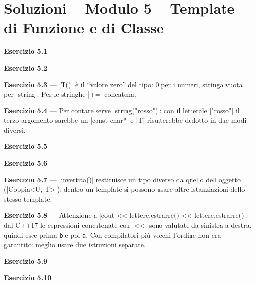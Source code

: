 \chapter{Soluzioni -- Modulo 5 -- Template di Funzione e di Classe}
\textbf{Esercizio 5.1}

\textbf{Esercizio 5.2}

\textbf{Esercizio 5.3} --- \cc|T()| è il ``valore zero'' del tipo: 0 per i numeri,
stringa vuota per \cc|string|. Per le stringhe \cc|+=| concatena.

\textbf{Esercizio 5.4} --- Per contare  serve \cc|string("rosso")|:
con il letterale \cc|"rosso"| il terzo argomento sarebbe un \cc|const char*| e
\cc|T| risulterebbe dedotto in due modi diversi.

\textbf{Esercizio 5.5}

\textbf{Esercizio 5.6}

\textbf{Esercizio 5.7} --- \cc|invertita()| restituisce un tipo diverso da quello
dell'oggetto (\cc|Coppia<U, T>|): dentro un template si possono usare altre
istanziazioni dello stesso template.

\textbf{Esercizio 5.8} --- Attenzione a
\cc|cout << lettere.estrarre() << lettere.estrarre()|: dal C++17 le espressioni
concatenate con \cc|<<| sono valutate da sinistra a destra, quindi esce prima
\texttt{b} e poi \texttt{a}. Con compilatori più vecchi l'ordine non era garantito:
meglio usare due istruzioni separate.

\textbf{Esercizio 5.9}

\textbf{Esercizio 5.10}
